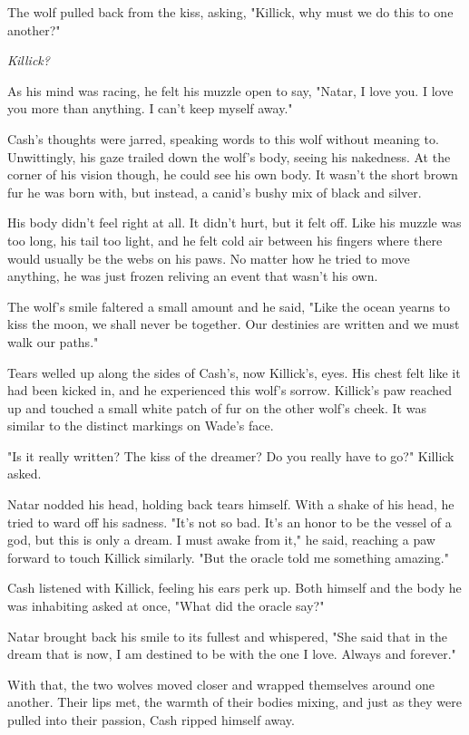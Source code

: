 The wolf pulled back from the kiss, asking, "Killick, why must we do this to one another?"

\emph{Killick?}

As his mind was racing, he felt his muzzle open to say, "Natar, I love you. I love you more than anything. I can't keep myself away."

Cash's thoughts were jarred, speaking words to this wolf without meaning to. Unwittingly, his gaze trailed down the wolf's body, seeing his nakedness. At the corner of his vision though, he could see his own body. It wasn't the short brown fur he was born with, but instead, a canid's bushy mix of black and silver.

His body didn't feel right at all. It didn't hurt, but it felt off. Like his muzzle was too long, his tail too light, and he felt cold air between his fingers where there would usually be the webs on his paws. No matter how he tried to move anything, he was just frozen reliving an event that wasn't his own.

The wolf's smile faltered a small amount and he said, "Like the ocean yearns to kiss the moon, we shall never be together. Our destinies are written and we must walk our paths."

Tears welled up along the sides of Cash's, now Killick's, eyes. His chest felt like it had been kicked in, and he experienced this wolf's sorrow. Killick's paw reached up and touched a small white patch of fur on the other wolf's cheek. It was similar to the distinct markings on Wade's face.

"Is it really written? The kiss of the dreamer? Do you really have to go?" Killick asked.

Natar nodded his head, holding back tears himself. With a shake of his head, he tried to ward off his sadness. "It's not so bad. It's an honor to be the vessel of a god, but this is only a dream. I must awake from it," he said, reaching a paw forward to touch Killick similarly. "But the oracle told me something amazing."

Cash listened with Killick, feeling his ears perk up. Both himself and the body he was inhabiting asked at once, "What did the oracle say?"

Natar brought back his smile to its fullest and whispered, "She said that in the dream that is now, I am destined to be with the one I love. Always and forever."

With that, the two wolves moved closer and wrapped themselves around one another. Their lips met, the warmth of their bodies mixing, and just as they were pulled into their passion, Cash ripped himself away.

